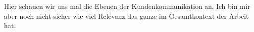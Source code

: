 \documentclass[../main.tex]{subfiles}
\begin{document}
Hier schauen wir uns mal die Ebenen der Kundenkommunikation an. Ich bin mir aber noch nicht sicher wie viel Relevanz das ganze im Gesamtkontext der Arbeit hat.
\end{document}
